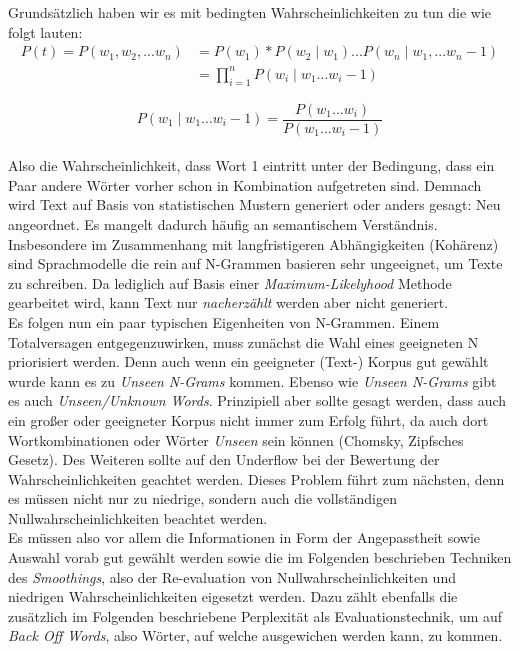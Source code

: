 \documentclass[12pt]{article}
\begin{document}
\noindent Grundsätzlich haben wir es mit bedingten Wahrscheinlichkeiten zu tun die wie folgt lauten:\\

\begin{equation}
	\begin{split}
		P(t) = P(w_1, w_2,...w_n) & = P(w_1)*P(w_2 \mid w_1)...P(w_n \mid w_1,...w_n-1) \\
		                          & = \prod_{i=1}^{n} P(w_i \mid w_1...w_i-1)
	\end{split}
\end{equation}

\begin{equation}
	P(w_1 \mid w_1...w_i-1) = \frac {P(w_1...w_i)}{P(w_1...w_i-1)}
\end{equation}
\\
Also die Wahrscheinlichkeit, dass Wort 1 eintritt unter der Bedingung, dass ein Paar andere Wörter vorher
schon in Kombination aufgetreten sind. Demnach wird Text auf Basis von statistischen Mustern generiert
oder anders gesagt: Neu angeordnet. Es mangelt dadurch häufig an semantischem Verständnis. Insbesondere
im Zusammenhang mit langfristigeren Abhängigkeiten (Kohärenz) sind Sprachmodelle die rein auf N-Grammen
basieren sehr ungeeignet, um Texte zu schreiben. Da lediglich auf Basis einer \textit{Maximum-Likelyhood}\cite{scheffervanck2019} Methode
gearbeitet wird, kann Text nur \textit{nacherzählt} werden aber nicht generiert.\\
Es folgen nun ein paar typischen Eigenheiten von N-Grammen. Einem Totalversagen entgegenzuwirken, muss
zunächst die Wahl eines geeigneten N priorisiert werden. Denn auch wenn ein geeigneter (Text-) Korpus
gut gewählt wurde kann es zu \textit{Unseen N-Grams}\cite{markert2019} kommen. Ebenso wie \textit{Unseen N-Grams}\cite{markert2019} gibt es
auch \textit{Unseen/Unknown Words}\cite{markert2019}. Prinzipiell aber sollte gesagt werden, dass auch ein großer oder geeigneter Korpus nicht immer zum
Erfolg führt, da auch dort Wortkombinationen oder Wörter \textit{Unseen} sein können (Chomsky, Zipfsches Gesetz).\cite{markert2019}
Des Weiteren sollte auf den Underflow bei der Bewertung der Wahrscheinlichkeiten geachtet werden. Dieses
Problem führt zum nächsten, denn es müssen nicht nur zu niedrige, sondern auch die vollständigen
Nullwahrscheinlichkeiten beachtet werden.\\
Es müssen also vor allem die Informationen in Form der Angepasstheit sowie Auswahl vorab gut gewählt werden
sowie die im Folgenden beschrieben Techniken des \textit{Smoothings}\cite{markert2019}, also der Re-evaluation von
Nullwahrscheinlichkeiten und niedrigen Wahrscheinlichkeiten eigesetzt werden. Dazu zählt ebenfalls die
zusätzlich im Folgenden beschriebene Perplexität als Evaluationstechnik, um auf \textit{Back Off Words}\cite{markert2019}, also
Wörter, auf welche ausgewichen werden kann, zu kommen.
\end{document}
